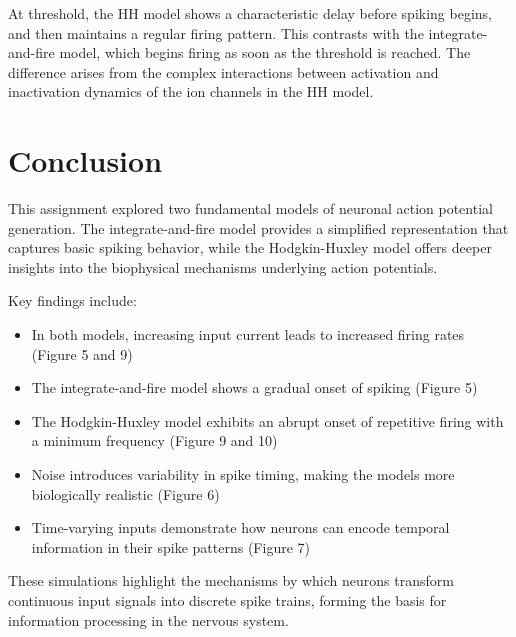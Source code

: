 \documentclass[11pt,a4paper]{article}
\begin{document}
At threshold, the HH model shows a characteristic delay before spiking begins, and then maintains a regular firing pattern. This contrasts with the integrate-and-fire model, which begins firing as soon as the threshold is reached. The difference arises from the complex interactions between activation and inactivation dynamics of the ion channels in the HH model.

\section*{Conclusion}

This assignment explored two fundamental models of neuronal action potential generation. The integrate-and-fire model provides a simplified representation that captures basic spiking behavior, while the Hodgkin-Huxley model offers deeper insights into the biophysical mechanisms underlying action potentials.

Key findings include:
\begin{itemize}
\item In both models, increasing input current leads to increased firing rates (Figure 5 and 9)
\item The integrate-and-fire model shows a gradual onset of spiking (Figure 5)
\item The Hodgkin-Huxley model exhibits an abrupt onset of repetitive firing with a minimum frequency (Figure 9 and 10)
\item Noise introduces variability in spike timing, making the models more biologically realistic (Figure 6)
\item Time-varying inputs demonstrate how neurons can encode temporal information in their spike patterns (Figure 7)
\end{itemize}

These simulations highlight the mechanisms by which neurons transform continuous input signals into discrete spike trains, forming the basis for information processing in the nervous system.
\end{document}
